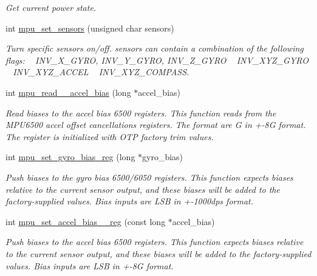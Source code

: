 \begin{DoxyCompactItemize}
\begin{DoxyCompactList}\small\item\em Get current power state. \end{DoxyCompactList}\item 
int \hyperlink{group___d_r_i_v_e_r_s_ga6e77e7cc1cf6be5e8fdf617c5b4586d1}{mpu\+\_\+set\+\_\+sensors} (unsigned char sensors)
\begin{DoxyCompactList}\small\item\em Turn specific sensors on/off. {\itshape sensors} can contain a combination of the following flags\+: ~\newline
 I\+N\+V\+\_\+\+X\+\_\+\+G\+Y\+RO, I\+N\+V\+\_\+\+Y\+\_\+\+G\+Y\+RO, I\+N\+V\+\_\+\+Z\+\_\+\+G\+Y\+RO ~\newline
 I\+N\+V\+\_\+\+X\+Y\+Z\+\_\+\+G\+Y\+RO ~\newline
 I\+N\+V\+\_\+\+X\+Y\+Z\+\_\+\+A\+C\+C\+EL ~\newline
 I\+N\+V\+\_\+\+X\+Y\+Z\+\_\+\+C\+O\+M\+P\+A\+SS. \end{DoxyCompactList}\item 
int \hyperlink{group___d_r_i_v_e_r_s_ga57bfbb356ce449135ce39659455041ae}{mpu\+\_\+read\+\_\+\_\+accel\+\_\+bias} (long $\ast$accel\+\_\+bias)
\begin{DoxyCompactList}\small\item\em Read biases to the accel bias 6500 registers. This function reads from the M\+P\+U6500 accel offset cancellations registers. The format are G in +-\/8G format. The register is initialized with O\+TP factory trim values. \end{DoxyCompactList}\item 
int \hyperlink{group___d_r_i_v_e_r_s_ga01361a0f5c1f048cb0742bd3d0e4d3a5}{mpu\+\_\+set\+\_\+gyro\+\_\+bias\+\_\+reg} (long $\ast$gyro\+\_\+bias)
\begin{DoxyCompactList}\small\item\em Push biases to the gyro bias 6500/6050 registers. This function expects biases relative to the current sensor output, and these biases will be added to the factory-\/supplied values. Bias inputs are L\+SB in +-\/1000dps format. \end{DoxyCompactList}\item 
int \hyperlink{group___d_r_i_v_e_r_s_gaa7265afee29b8307ff49a8b1ccd9238a}{mpu\+\_\+set\+\_\+accel\+\_\+bias\+\_\+\_\+reg} (const long $\ast$accel\+\_\+bias)
\begin{DoxyCompactList}\small\item\em Push biases to the accel bias 6500 registers. This function expects biases relative to the current sensor output, and these biases will be added to the factory-\/supplied values. Bias inputs are L\+SB in +-\/8G format. \end{DoxyCompactList}\item 

\end{DoxyCompactItemize}
